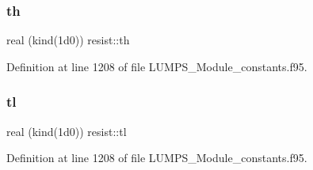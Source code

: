 \subsubsection{\texorpdfstring{th}{th}}
{\footnotesize\ttfamily real (kind(1d0)) resist\+::th}



Definition at line 1208 of file L\+U\+M\+P\+S\+\_\+\+Module\+\_\+constants.\+f95.

\mbox{\label{namespaceresist_ac5a785e8c6079704fe779baff78c5c54}} 
\subsubsection{\texorpdfstring{tl}{tl}}
{\footnotesize\ttfamily real (kind(1d0)) resist\+::tl}



Definition at line 1208 of file L\+U\+M\+P\+S\+\_\+\+Module\+\_\+constants.\+f95.

